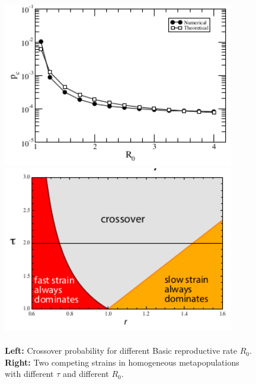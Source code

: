 \documentclass[../main/main.tex]{subfiles}
\begin{document}
\begin{figure}[h!]
\begin{minipage}[c]{0.5\linewidth}
\centering
\includegraphics[width=0.9\textwidth]{../lessons/image/16/image10a.png}
\end{minipage}
\begin{minipage}[]{0.5\linewidth}
\centering
\includegraphics[width=0.9\textwidth]{../lessons/image/16/image10b.png}
\end{minipage}
\caption{\label{fig:16_10}\\ \textbf{Left:} Crossover probability for different Basic reproductive rate $R_0$.\\ \textbf{Right:} Two competing strains in homogeneous metapopulations with different $\tau$ and different $R_0$.}
\end{figure}
\end{document}
